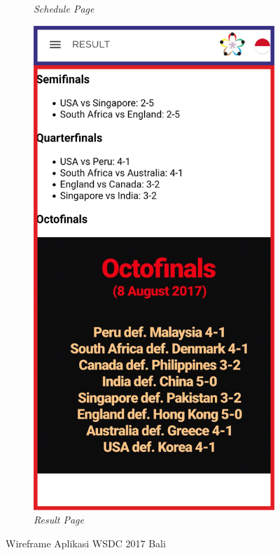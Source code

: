 \begin{enumerate}
\begin{figure}[H]
\begin{subfigure}[b]{0.247\textwidth}
	    \caption{{\it Schedule Page}}
	    \label{fig:SchedulePageWireframe}
     \end{subfigure}
	\begin{subfigure}[b]{0.247\textwidth}
    \centering
	    \includegraphics[scale=0.4]{Gambar/ResultPageWireframe.png}
	    \caption{{\it Result Page}}
	    \label{fig:ResultPageWireframe}
     \end{subfigure}
	\caption{Wireframe Aplikasi WSDC 2017 Bali}
        \label{fig:three graphs}
\end{figure}


\end{enumerate}
